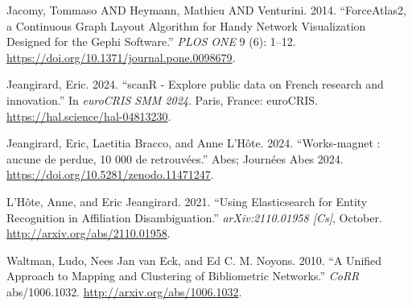 \documentclass[
]{article}
\newlength{\cslhangindent}
\newenvironment{cslreferences}%
  {\setlength{\parindent}{0pt}%
  \everypar{\setlength{\hangindent}{\cslhangindent}}\ignorespaces}%
  {\par}
\begin{document}
\begin{cslreferences}
\leavevmode\hypertarget{ref-10.1371ux2fjournal.pone.0098679}{}%
Jacomy, Tommaso AND Heymann, Mathieu AND Venturini. 2014. ``ForceAtlas2,
a Continuous Graph Layout Algorithm for Handy Network Visualization
Designed for the Gephi Software.'' \emph{PLOS ONE} 9 (6): 1--12.
\url{https://doi.org/10.1371/journal.pone.0098679}.

\leavevmode\hypertarget{ref-jeangirard:hal-04813230}{}%
Jeangirard, Eric. 2024. ``scanR - Explore public data on French research
and innovation.'' In \emph{euroCRIS SMM 2024}. Paris, France: euroCRIS.
\url{https://hal.science/hal-04813230}.

\leavevmode\hypertarget{ref-jeangirard:hal-04598201}{}%
Jeangirard, Eric, Laetitia Bracco, and Anne L'Hôte. 2024. ``Works-magnet
: aucune de perdue, 10 000 de retrouvées.'' Abes; Journées Abes 2024.
\url{https://doi.org/10.5281/zenodo.11471247}.

\leavevmode\hypertarget{ref-lhote_using_2021}{}%
L'Hôte, Anne, and Eric Jeangirard. 2021. ``Using Elasticsearch for
Entity Recognition in Affiliation Disambiguation.''
\emph{arXiv:2110.01958 {[}Cs{]}}, October.
\url{http://arxiv.org/abs/2110.01958}.

\leavevmode\hypertarget{ref-DBLP:journalsux2fcorrux2fabs-1006-1032}{}%
Waltman, Ludo, Nees Jan van Eck, and Ed C. M. Noyons. 2010. ``A Unified
Approach to Mapping and Clustering of Bibliometric Networks.''
\emph{CoRR} abs/1006.1032. \url{http://arxiv.org/abs/1006.1032}.
\end{cslreferences}
\end{document}
